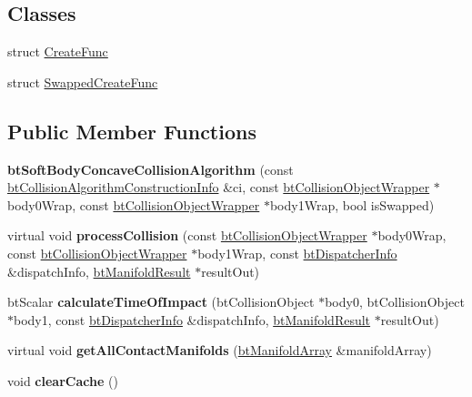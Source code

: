 \subsection*{Classes}
\begin{DoxyCompactItemize}
\item 
struct \hyperlink{structbtSoftBodyConcaveCollisionAlgorithm_1_1CreateFunc}{Create\+Func}
\item 
struct \hyperlink{structbtSoftBodyConcaveCollisionAlgorithm_1_1SwappedCreateFunc}{Swapped\+Create\+Func}
\end{DoxyCompactItemize}
\subsection*{Public Member Functions}
\begin{DoxyCompactItemize}
\item 
\mbox{\label{classbtSoftBodyConcaveCollisionAlgorithm_a900d1d275efdad02fc6b745f228809fe}} 
{\bfseries bt\+Soft\+Body\+Concave\+Collision\+Algorithm} (const \hyperlink{structbtCollisionAlgorithmConstructionInfo}{bt\+Collision\+Algorithm\+Construction\+Info} \&ci, const \hyperlink{structbtCollisionObjectWrapper}{bt\+Collision\+Object\+Wrapper} $\ast$body0\+Wrap, const \hyperlink{structbtCollisionObjectWrapper}{bt\+Collision\+Object\+Wrapper} $\ast$body1\+Wrap, bool is\+Swapped)
\item 
\mbox{\label{classbtSoftBodyConcaveCollisionAlgorithm_a3d8cac51dc97009aa5ec20089d8bca8b}} 
virtual void {\bfseries process\+Collision} (const \hyperlink{structbtCollisionObjectWrapper}{bt\+Collision\+Object\+Wrapper} $\ast$body0\+Wrap, const \hyperlink{structbtCollisionObjectWrapper}{bt\+Collision\+Object\+Wrapper} $\ast$body1\+Wrap, const \hyperlink{structbtDispatcherInfo}{bt\+Dispatcher\+Info} \&dispatch\+Info, \hyperlink{classbtManifoldResult}{bt\+Manifold\+Result} $\ast$result\+Out)
\item 
\mbox{\label{classbtSoftBodyConcaveCollisionAlgorithm_ab87e28ad2421521ef7ea031c5362050f}} 
bt\+Scalar {\bfseries calculate\+Time\+Of\+Impact} (bt\+Collision\+Object $\ast$body0, bt\+Collision\+Object $\ast$body1, const \hyperlink{structbtDispatcherInfo}{bt\+Dispatcher\+Info} \&dispatch\+Info, \hyperlink{classbtManifoldResult}{bt\+Manifold\+Result} $\ast$result\+Out)
\item 
\mbox{\label{classbtSoftBodyConcaveCollisionAlgorithm_a94cd631f80c90cff9e1ff922bb3bac40}} 
virtual void {\bfseries get\+All\+Contact\+Manifolds} (\hyperlink{classbtAlignedObjectArray}{bt\+Manifold\+Array} \&manifold\+Array)
\item 
\mbox{\label{classbtSoftBodyConcaveCollisionAlgorithm_a2b105422795e7fafaadd705d6e08a9d4}} 
void {\bfseries clear\+Cache} ()
\end{DoxyCompactItemize}
